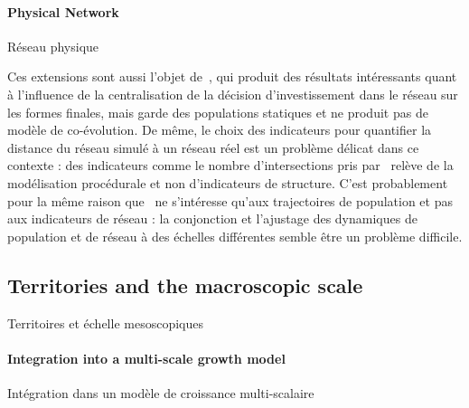 \paragraph{Physical Network}{Réseau physique}



Ces extensions sont aussi l'objet de~\cite{mimeur:tel-01451164}, qui produit des résultats intéressants quant à l'influence de la centralisation de la décision d'investissement dans le réseau sur les formes finales, mais garde des populations statiques et ne produit pas de modèle de co-évolution. De même, le choix des indicateurs pour quantifier la distance du réseau simulé à un réseau réel est un problème délicat dans ce contexte : des indicateurs comme le nombre d'intersections pris par~\cite{mimeur:tel-01451164} relève de la modélisation procédurale et non d'indicateurs de structure. C'est probablement pour la même raison que~\cite{schmitt2014modelisation} ne s'intéresse qu'aux trajectoires de population et pas aux indicateurs de réseau : la conjonction et l'ajustage des dynamiques de population et de réseau à des échelles différentes semble être un problème difficile.





\subsection{Territories and the macroscopic scale}{Territoires et échelle mesoscopiques}






\paragraph{Integration into a multi-scale growth model}{Intégration dans un modèle de croissance multi-scalaire}

